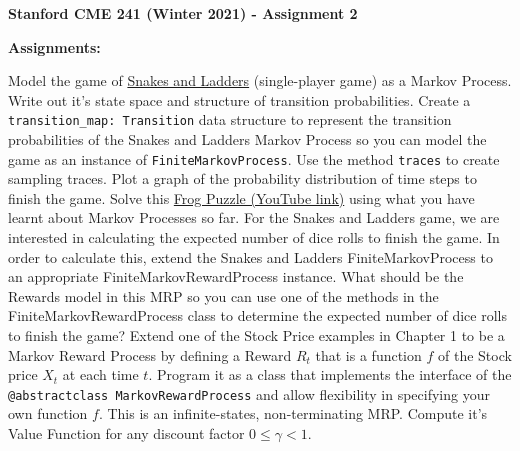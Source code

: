 \documentclass[12pt]{exam}
\begin{document}
\begin{center}
{\large {\bf Stanford CME 241 (Winter 2021) - Assignment 2}}
\end{center}
 
{\large{\bf Assignments:}}
\begin{questions}
\question Model the game of \href{https://toytheater.com/snakes-and-ladders/}{Snakes and Ladders} (single-player game) as a Markov Process. Write out it's state space and structure of transition probabilities.
\question Create a \lstinline{transition_map: Transition} data structure to represent the transition probabilities of the Snakes and Ladders Markov Process so you can model the game as an instance of \lstinline{FiniteMarkovProcess}. Use the method \lstinline{traces} to create sampling traces. Plot a graph of the probability distribution of time steps to finish the game.
\question Solve this \href{https://www.youtube.com/watch?v=ZLTyX4zL2Fc}{Frog Puzzle (YouTube link)} using what you have learnt about Markov Processes so far.
\question For the Snakes and Ladders game, we are interested in calculating the expected number of dice rolls to finish the game. In order to calculate this, extend the Snakes and Ladders FiniteMarkovProcess to an appropriate FiniteMarkovRewardProcess instance. What should be the Rewards model in this MRP so you can use one of the methods in the FiniteMarkovRewardProcess class to determine the expected number of dice rolls to finish the game?
\question Extend one of the Stock Price examples in Chapter 1 to be a Markov Reward Process by defining a Reward $R_t$ that is a function $f$ of the Stock price $X_t$ at each time $t$. Program it as a class that implements the interface of the \lstinline{@abstractclass MarkovRewardProcess} and allow flexibility in specifying your own function $f$. This is an infinite-states, non-terminating MRP. Compute it's Value Function for any discount factor $0 \leq \gamma < 1$.
\end{questions}
\end{document}
